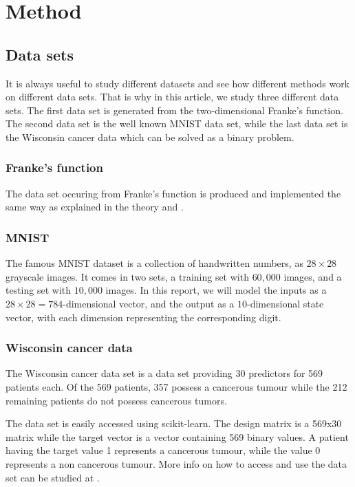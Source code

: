\documentclass[../main.tex]{subfiles}
\begin{document}
\section{Method}
\subsection{Data sets}
It is always useful to study different datasets and see how different methods work on different data sets. That is why in this article, we study three different data sets. The first data set is generated from the two-dimensional Franke's function. The second data set is the well known MNIST data set, while the last data set is the Wisconsin cancer data which can be solved as a binary problem.

\subsubsection{Franke's function}
The data set occuring from Franke's function is produced and implemented the same way as explained in the theory and \cite{project2}.

\subsubsection{MNIST}
The famous MNIST dataset is a collection of handwritten numbers, as $28\times 28$ grayscale images. It comes in two sets, a training set with $60,000$ images, and a testing set with $10,000$ images. In this report, we will model the inputs as a $28\times 28 = 784$-dimensional vector, and the output as a $10$-dimensional state vector, with each dimension representing the corresponding digit.

\subsubsection{Wisconsin cancer data}
The Wisconsin cancer data set is a data set providing 30 predictors for 569 patients each. Of the 569 patients, 357 possess a cancerous tumour while the 212 remaining patients do not possess cancerous tumors.

The data set is easily accessed using scikit-learn. The design matrix is a 569x30 matrix while the target vector is a vector containing 569 binary values. A patient having the target value 1 represents a cancerous tumour, while the value 0 represents a non cancerous tumour. More info on how to access and use the data set can be studied at \cite{scikit-learn}.
\end{document}
